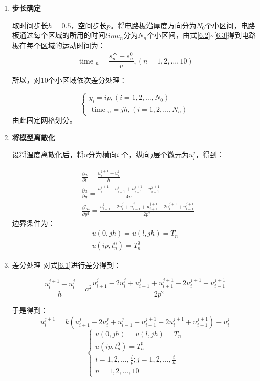 \documentclass[withoutpreface,bwprint]{cumcmthesis} %
\numberwithin{equation}{subsection}
\begin{document}
\begin{enumerate}
	\item \textbf{步长确定}
	
	取时间步长$ℎ=0.5$，空间步长$p$。将电路板沿厚度方向分为$N_{0}$个小区间，电路板通过每个区域的所用的时间$time_{n}$分为$N_{n}$个小区间，由式\eqref{6.2}\~{}\eqref{6.3}得到电路板在每个区域的运动时间为：
	\begin{equation}
		\text { time }_{n}=\frac{s_{n}^\text{末}-s_{n}^{0}}{v},(n=1,2, \ldots, 10)
	\end{equation}

	所以，对10个小区域依次差分处理：

	$$\left\{\begin{array}{l}
	y_{i}=i p,\left(i=1,2, \ldots, N_{0}\right) \\
	\text { time }_{n}=j h,\left(i=1,2, \ldots, N_{n}\right)
	\end{array}\right.$$
	由此固定网格划分。
	\item \textbf{将模型离散化}
	
	设将温度离散化后，将$u$分为横向$𝑖$ 个，纵向$j$层个微元为$u_{i}^j$，得到\cite{lishan2020}：

	\begin{equation}
		\begin{aligned}
		&\frac{\partial u}{\partial t}=\frac{u_{i}^{j+1}-u_{i}^{j}}{h} \\
		&\frac{\partial u}{\partial y}=\frac{u_{i}^{j+1}-u_{i-1}^{j}+u_{i+1}^{j+1}-u_{i-1}^{j+1}}{4 p} \\
		&\frac{\partial^{2} u}{\partial y^{2}}=\frac{u_{i+1}^{j}-2 u_{i}^{j}+u_{i-1}^{j}+u_{i+1}^{j+1}-2 u_{i}^{j+1}+u_{i-1}^{j+1}}{2 p^{2}}
		\end{aligned}
		\label{6.17}
	\end{equation}
	边界条件为：
	$$\begin{gathered}
	u(0, j h)=u(l, j h)=T_{n} \\
	u\left(i p, t_{n}^{0}\right)=T_{n}^{0}
	\end{gathered}$$

	\item 差分处理
	对式\eqref{6.1}进行差分得到\cite{lishan2020}：

	\begin{equation}
		\frac{u_{i}^{j+1}-u_{i}^{j}}{h}=a^{2} \frac{u_{i+1}^{j}-2 u_{i}^{j}+u_{i-1}^{j}+u_{i+1}^{j+1}-2 u_{i}^{j+1}+u_{i-1}^{j+1}}{2 p^{2}}
		\label{6.18.5}
	\end{equation}

	于是得到：
		$$
	u_{i}^{j+1}=k\left(u_{i+1}^{j}-2 u_{i}^{j}+u_{i-1}^{j}+u_{i+1}^{j+1}-2 u_{i}^{j+1}+u_{i-1}^{j+1}\right)+u_{i}^{j}
	$$
	\begin{equation}
		\left\{\begin{array}{l}
		u(0, j h)=u(l, j h)=T_{n} \\
		u\left(i p, t_{n}^{0}\right)=T_{n}^{0} \\
		i=1,2, \ldots, \frac{l}{p} ; j=1,2, \ldots, \frac{t}{h} \\
		n=1,2, \ldots, 10
		\end{array}\right.
		\label{6.18}
	\end{equation}


\end{enumerate}
\end{document}
